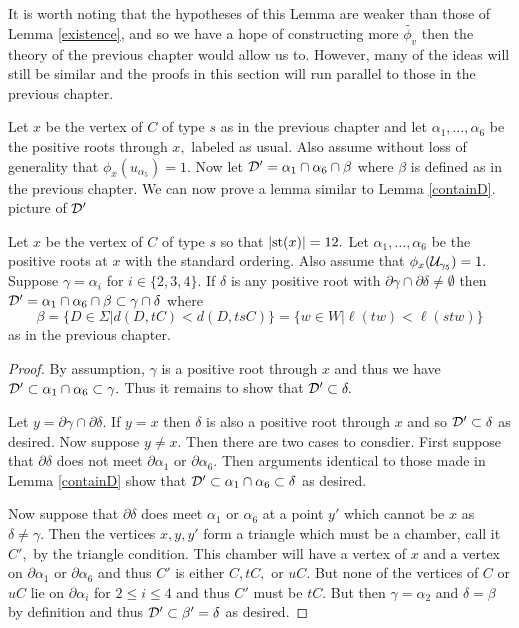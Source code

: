 \documentclass[class=book, crop=false]{standalone}
\begin{document}
It is worth noting that the hypotheses of this Lemma are weaker than those of Lemma \ref{existence}, and so we have a hope of constructing more $\tilde{\phi_v}$ then the theory of the previous chapter would allow us to. However, many of the ideas will still be similar and the proofs in this section will run parallel to those in the previous chapter.

Let $x$ be the vertex of $C$ of type $s$ as in the previous chapter and let $\alpha_1,\dots,\alpha_6$ be the positive roots through $x,$ labeled as usual. Also assume without loss of generality that $\phi_x(u_{\alpha_5})=1.$ Now let $\mathcal{D}'=\alpha_1\cap \alpha_6\cap \beta$ where $\beta$ is defined as in the previous chapter. We can now prove a lemma similar to Lemma \ref{containD}.\\
\Huge picture of $\mathcal{D}'$\normalsize\\

\begin{lemma}
	\label{336f2containD}
	Let $x$ be the vertex of $C$ of type $s$ so that $|\mathrm{st}(x)|=12.$ Let $\alpha_1,\dots,\alpha_6$ be the positive roots at $x$ with the standard ordering. Also assume that $\phi_x(\mathcal{U}_{\gamma_5})=1.$ Suppose $\gamma=\alpha_i$ for $i\in \{2,3,4\}.$ If $\delta$ is any positive root with $\partial\gamma\cap \partial\delta\neq \emptyset$ then $\mathcal{D}'=\alpha_1\cap \alpha_6\cap \beta\subset \gamma\cap \delta$ where 
	\[
	\beta=\{D\in \Sigma|d(D,tC)<d(D,tsC)\}=\{w\in W|\ell(tw)<\ell(stw)\}
	\]
	as in the previous chapter.
\end{lemma}
\begin{proof}
	By assumption, $\gamma$ is a positive root through $x$ and thus we have $\mathcal{D}'\subset \alpha_1\cap \alpha_6\subset \gamma.$ Thus it remains to show that $\mathcal{D}'\subset \delta.$

	Let $y=\partial\gamma\cap \partial\delta.$ If $y=x$ then $\delta$ is also a positive root through $x$ and so $\mathcal{D}'\subset \delta$ as desired. Now suppose $y\neq x.$ Then there are two cases to consdier. First suppose that $\partial \delta$ does not meet $\partial\alpha_1$ or $\partial\alpha_6.$ Then arguments identical to those made in Lemma \ref{containD} show that $\mathcal{D}'\subset \alpha_1\cap \alpha_6\subset \delta$ as desired.

Now suppose that $\partial\delta$ does meet $\alpha_1$ or $\alpha_6$ at a point $y'$ which cannot be $x$ as $\delta\neq \gamma.$ Then the vertices $x,y,y'$ form a triangle which must be a chamber, call it $C',$ by the triangle condition. This chamber will have a vertex of $x$ and a vertex on $\partial\alpha_1$ or $\partial\alpha_6$ and thus $C'$ is either $C,tC,$ or $uC.$ But none of the vertices of $C$ or $uC$ lie on $\partial\alpha_i$ for $2\le i\le 4$ and thus $C'$ must be $tC.$ But then $\gamma=\alpha_2$ and $\delta=\beta$ by definition and thus $\mathcal{D}'\subset \beta'=\delta$ as desired.
\end{proof}
\end{document}
